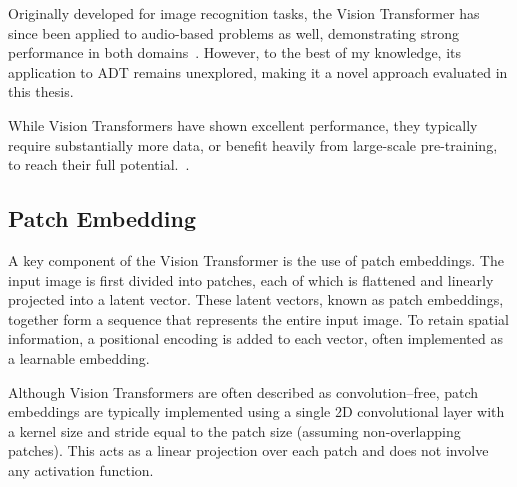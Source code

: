 Originally developed for image recognition tasks, the Vision Transformer has since been applied to audio-based problems as well, demonstrating strong performance in both domains~\cite{dosovitskiy2021imageworth16x16words, gong2021astaudiospectrogramtransformer}. However, to the best of my knowledge, its application to \gls{ADT} remains unexplored, making it a novel approach evaluated in this thesis.

While Vision Transformers have shown excellent performance, they typically require substantially more data, or benefit heavily from large-scale pre-training, to reach their full potential.~\cite{dosovitskiy2021imageworth16x16words}.

\subsection{Patch Embedding}

A key component of the Vision Transformer is the use of patch embeddings. The input image is first divided into patches, each of which is flattened and linearly projected into a latent vector. These latent vectors, known as patch embeddings, together form a sequence that represents the entire input image. To retain spatial information, a positional encoding is added to each vector, often implemented as a learnable embedding.

Although Vision Transformers are often described as convolution–free, patch embeddings are typically implemented using a single 2D convolutional layer with a kernel size and stride equal to the patch size (assuming non-overlapping patches). This acts as a linear projection over each patch and does not involve any activation function.

